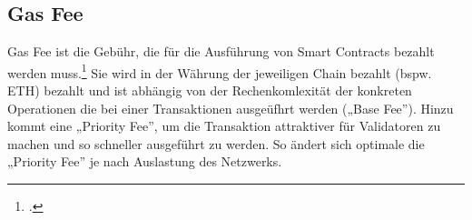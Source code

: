 \subsection{Gas Fee}
\label{sec:definition-gas-fee}
Gas Fee ist die Gebühr, die für die Ausführung von Smart Contracts bezahlt werden muss.\footcite[Vgl. hierzu und zum Folgenden][]{w31} 
Sie wird in der Währung der jeweiligen Chain bezahlt (bspw. ETH) bezahlt und ist abhängig von der Rechenkomlexität der konkreten Operationen die bei einer Transaktionen ausgeüfhrt werden („Base Fee”).
Hinzu kommt eine „Priority Fee”, um die Transaktion attraktiver für Validatoren zu machen und so schneller ausgeführt zu werden.
So ändert sich optimale die „Priority Fee” je nach Auslastung des Netzwerks. 